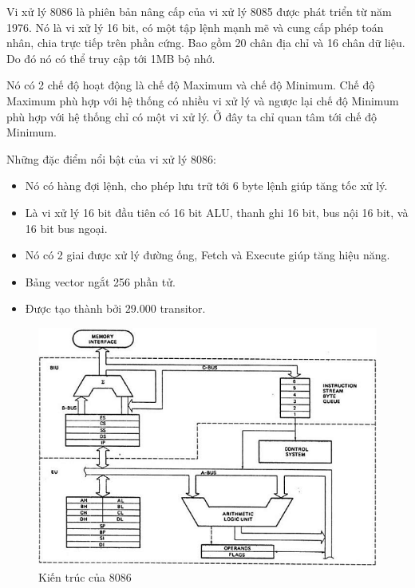 \documentclass[../report.tex]{subfiles}
\begin{document}
Vi xử lý 8086 là phiên bản nâng cấp của vi xử lý 8085 được phát triển từ năm 1976. 
Nó là vi xử lý 16 bit, có một tập lệnh mạnh mẽ và cung cấp phép toán nhân, chia trực tiếp trên phần cứng. 
Bao gồm 20 chân địa chỉ và 16 chân dữ liệu. 
Do đó nó có thể truy cập tới 1MB bộ nhớ. 

Nó có 2 chế độ hoạt động là chế độ Maximum và chế độ Minimum. Chế độ Maximum phù hợp với hệ thống có nhiều 
vi xử lý và ngược lại chế độ Minimum phù hợp với hệ thống chỉ có một vi xử lý. Ở đây ta chỉ quan tâm tới chế 
độ Minimum. 

Những đặc điểm nổi bật của vi xử lý 8086: 
\begin{itemize}
    \item Nó có hàng đợi lệnh, cho phép lưu trữ tới 6 byte lệnh giúp tăng tốc xử lý. 
    \item Là vi xử lý 16 bit đầu tiên có 16 bit ALU, thanh ghi 16 bit, bus nội 16 bit, và 16 bit bus ngoại. 
    \item Nó có 2 giai được xử lý đường ống, Fetch và Execute giúp tăng hiệu năng. 
    \item Bảng vector ngắt 256 phần tử. 
    \item Được tạo thành bởi $29.000$ transitor. 
\end{itemize}

\begin{figure}[H]
    \centering
    \includegraphics[width=12cm]{figures/8086-architecture.jpg}
    \caption{Kiến trúc của 8086}
\end{figure}
\end{document}
